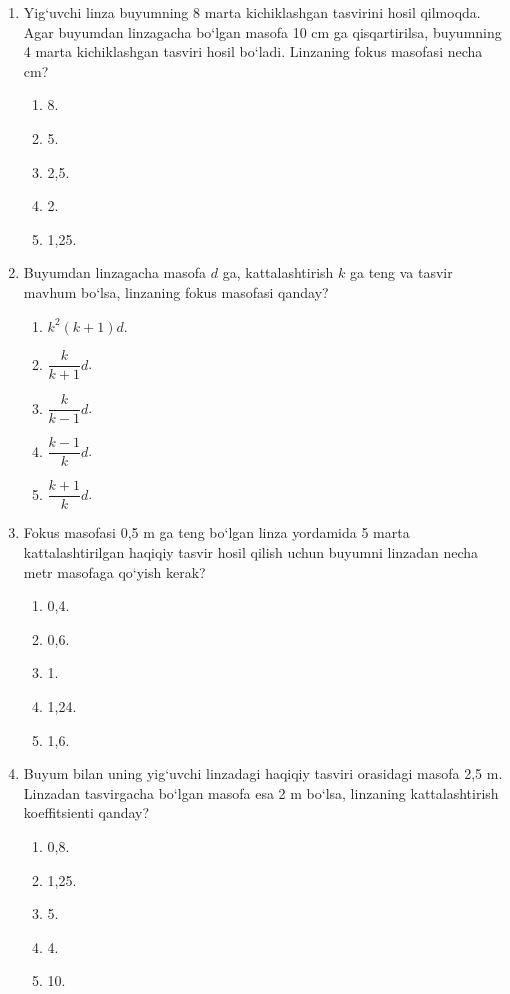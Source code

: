 \begin{enumerate}
\item Yig‘uvchi linza buyumning 8 marta kichiklashgan tasvirini hosil qilmoqda. Agar buyumdan linzagacha bo‘lgan masofa 10 cm ga qisqartirilsa, buyumning 4 marta kichiklashgan tasviri hosil bo‘ladi. Linzaning fokus masofasi necha cm?
\begin{enumerate}[label=\Alph*)]
\item 8.
\item 5.
\item 2,5.
\item 2.
\item 1,25.
\end{enumerate}

\item Buyumdan linzagacha masofa $d$ ga, kattalashtirish $k$ ga teng va tasvir mavhum bo‘lsa, linzaning fokus masofasi qanday?
\begin{enumerate}[label=\Alph*)]
\item $k^2(k+1)d$.
\item $\dfrac{k}{k+1}d$.
\item $\dfrac{k}{k-1}d$.
\item $\dfrac{k-1}{k}d$.
\item $\dfrac{k+1}{k}d$.
\end{enumerate}

\item Fokus masofasi 0,5 m ga teng bo‘lgan linza yordamida 5 marta kattalashtirilgan haqiqiy tasvir hosil qilish uchun buyumni linzadan necha metr masofaga qo‘yish kerak?
\begin{enumerate}[label=\Alph*)]
\item 0,4.
\item 0,6.
\item 1.
\item 1,24.
\item 1,6.
\end{enumerate}

\item Buyum bilan uning yig‘uvchi linzadagi haqiqiy tasviri orasidagi masofa 2,5 m. Linzadan tasvirgacha bo‘lgan masofa esa 2 m bo‘lsa, linzaning kattalashtirish koeffitsienti qanday?
\begin{enumerate}[label=\Alph*)]
\item 0,8.
\item 1,25.
\item 5.
\item 4.
\item 10.
\end{enumerate}


\end{enumerate}
